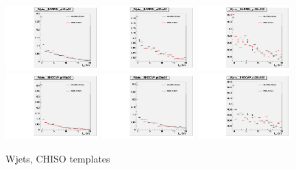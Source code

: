 \begin{figure}[htb]
  \begin{center}
  \includegraphics[width=0.32\textwidth]{../figs/figs_v11/ChannelsMERGED_WGamma/QuickChecks/cTemplatesVsWMt_Wjets_phoPFChIsoCorr_BARREL_pt15to20.pdf} \includegraphics[width=0.32\textwidth]{../figs/figs_v11/ChannelsMERGED_WGamma/QuickChecks/cTemplatesVsWMt_Wjets_phoPFChIsoCorr_BARREL_pt20to35.pdf} \includegraphics[width=0.32\textwidth]{../figs/figs_v11/ChannelsMERGED_WGamma/QuickChecks/cTemplatesVsWMt_Wjets_phoPFChIsoCorr_BARREL_pt35to500.pdf}\\
  \includegraphics[width=0.32\textwidth]{../figs/figs_v11/ChannelsMERGED_WGamma/QuickChecks/cTemplatesVsWMt_Wjets_phoPFChIsoCorr_ENDCAP_pt15to20.pdf} \includegraphics[width=0.32\textwidth]{../figs/figs_v11/ChannelsMERGED_WGamma/QuickChecks/cTemplatesVsWMt_Wjets_phoPFChIsoCorr_ENDCAP_pt20to35.pdf} \includegraphics[width=0.32\textwidth]{../figs/figs_v11/ChannelsMERGED_WGamma/QuickChecks/cTemplatesVsWMt_Wjets_phoPFChIsoCorr_ENDCAP_pt35to500.pdf}\\
  \caption{Wjets, CHISO templates}
  \label{fig:templatesVsWMt_Wjets_CHISO}
  \end{center}
\end{figure}

